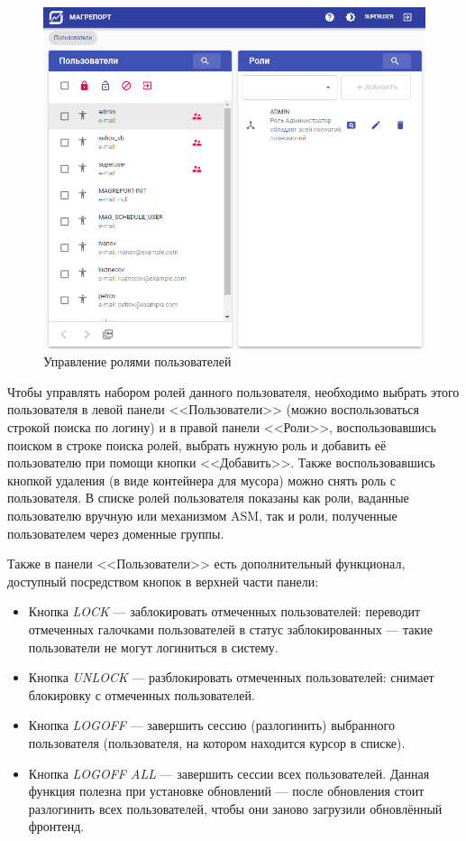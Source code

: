 \documentclass[../user-manual.tex]{subfiles}
\begin{document}
	\begin{figure}[h]
		\centering
		\includegraphics[width=\graphicswidth]{img/05-users.png}
		\caption{Управление ролями пользователей}
		\label{fig:users}
	\end{figure}

	Чтобы управлять набором ролей данного пользователя, необходимо выбрать этого пользователя в левой панели <<Пользователи>> (можно воспользоваться строкой поиска по логину) и в правой панели <<Роли>>, воспользовавшись поиском в строке поиска ролей, выбрать нужную роль и добавить её пользователю при помощи кнопки <<Добавить>>. Также воспользовавшись кнопкой удаления (в виде контейнера для мусора) можно снять роль с пользователя. В списке ролей пользователя показаны как роли, ваданные пользователю вручную или механизмом ASM, так и роли, полученные пользователем через доменные группы.
	
	Также в панели <<Пользователи>> есть дополнительный функционал, доступный посредством кнопок в верхней части панели:
	
	\begin{itemize}
		\item Кнопка \textit{LOCK} --- заблокировать отмеченных пользователей: переводит отмеченных галочками пользователей в статус заблокированных --- такие пользователи не могут логиниться в систему.
		
		\item Кнопка \textit{UNLOCK} --- разблокировать отмеченных пользователей: снимает блокировку с отмеченных пользователей.
		
		\item Кнопка \textit{LOGOFF} --- завершить сессию (разлогинить) выбранного пользователя (пользователя, на котором находится курсор в списке).
		
		\item Кнопка \textit{LOGOFF ALL} --- завершить сессии всех пользователей. Данная функция полезна при установке обновлений --- после обновления стоит разлогинить всех пользователей, чтобы они заново загрузили обновлённый фронтенд.
		
	\end{itemize}
	
\end{document}
